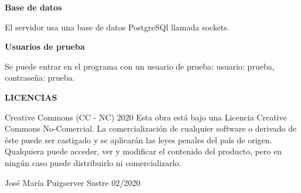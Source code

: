 {\bfseries Base de datos}

El servidor usa una base de datos Postgre\+S\+Ql llamada sockets.

{\bfseries Usuarios de prueba}

Se puede entrar en el programa con un usuario de prueba\+: usuario\+: prueba, contraseña\+: prueba.

{\bfseries L\+I\+C\+E\+N\+C\+I\+AS}

\begin{DoxyVerb}Creative Commons (CC - NC) 2020
Esta obra está bajo una Licencia Creative Commons No-Comercial. 
La comercialización de cualquier software  o derivado de éste puede ser castigado y se aplicarán las leyes penales
del país de origen. Qualquiera puede acceder, ver y modificar el contenido del producto, pero en ningún caso puede
distribuirlo ni comercializarlo. 

José María Puigserver Sastre
02/2020\end{DoxyVerb}
 